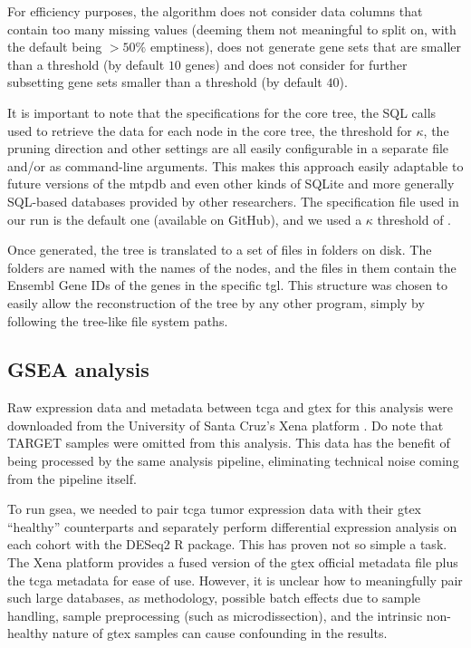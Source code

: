 For efficiency purposes, the algorithm does not consider data columns that
contain too many missing values (deeming them not meaningful to split on, with
the default being $> 50\%$ emptiness), does not generate gene sets that are
smaller than a threshold (by default $10$ genes) and does not consider for
further subsetting gene sets smaller than a threshold (by default $40$).

It is important to note that the specifications for the core tree, the SQL
calls used to retrieve the data for each node in the core tree, the threshold
for $\kappa$, the pruning direction and other settings are all easily
configurable in a separate file and/or as command-line arguments. This makes
this approach easily adaptable to future versions of the \gls{mtpdb} and even
other kinds of SQLite and more generally SQL-based databases provided by other
researchers. The specification file used in our run is the default one
(available on GitHub), and we used a $\kappa$ threshold of .

Once generated, the tree is translated to a set of files in folders on disk. The
folders are named with the names of the nodes, and the  files in
them contain the Ensembl Gene IDs of the genes in the specific \gls{tgl}. This
structure was chosen to easily allow the reconstruction of the tree by any other
program, simply by following the tree-like file system paths.



\subsection{GSEA analysis}

Raw expression data and metadata between \gls{tcga} and \gls{gtex} for this
analysis were downloaded from the University of Santa Cruz's Xena platform
\cite{UCSCXena}. Do note that TARGET samples were omitted from this analysis.
This data has the benefit of being processed by the same analysis pipeline,
eliminating technical noise coming from the pipeline itself.

To run \gls{gsea}, we needed to pair \gls{tcga} tumor expression data with their
\gls{gtex} ``healthy'' counterparts and separately perform differential expression
analysis on each cohort with the DESeq2 R package. This has proven not so simple
a task. The Xena platform provides a fused version of the \gls{gtex} official
metadata file plus the \gls{tcga} metadata for ease of use. However, it is
unclear how to meaningfully pair such large databases, as methodology, possible
batch effects due to sample handling, sample preprocessing (such as
microdissection), and the intrinsic non-healthy nature of \gls{gtex} samples can
cause confounding in the results. 


